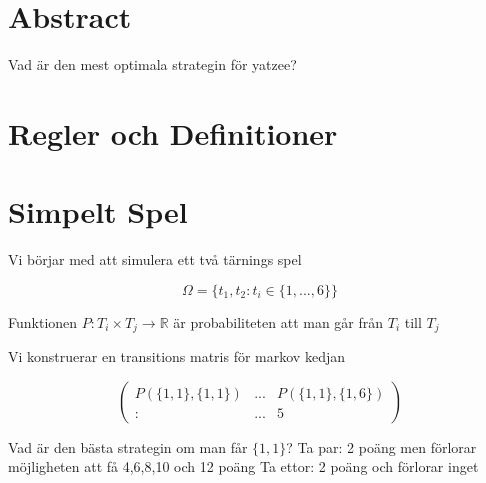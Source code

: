 \documentclass[a4paper,12pt]{article}
\begin{document}
\section{Abstract}
Vad är den mest optimala strategin för yatzee?

\section{Regler och Definitioner}



\section{Simpelt Spel}
Vi börjar med att simulera ett två tärnings spel

\begin{equation}
    \Omega=\{t_1,t_2:t_i\in\{1,...,6\}\}
\end{equation}

Funktionen $P:T_i\times T_j \rightarrow \mathds{R}$ är probabiliteten att man går från $T_i$ till $T_j$


Vi konstruerar en transitions matris för markov kedjan

$$
\begin{pmatrix}
    P(\{1,1\},\{1,1\})&...&P(\{1,1\},\{1,6\})\\
    :&...&5
\end{pmatrix}
$$

Vad är den bästa strategin om man får $\{1,1\}$?
Ta par: 2 poäng men förlorar möjligheten att få 4,6,8,10 och 12 poäng
Ta ettor: 2 poäng och förlorar inget
\end{document}
